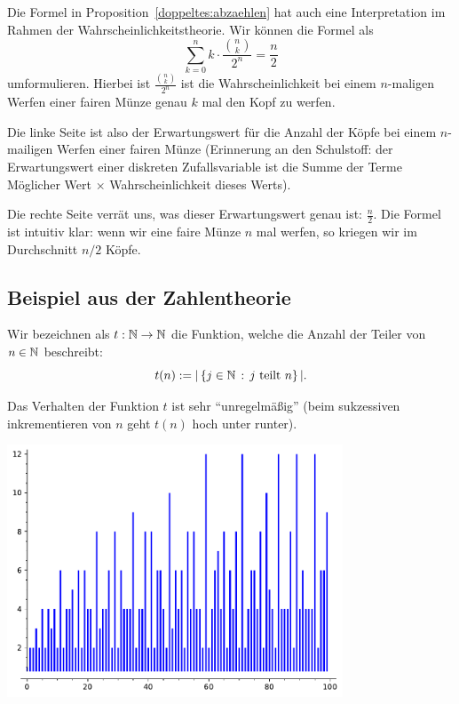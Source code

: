 \begin{bem}
	Die Formel in Proposition~\ref{doppeltes:abzaehlen} hat auch eine Interpretation im Rahmen der Wahrscheinlichkeitstheorie. Wir können die Formel als 
	\[
		\sum_{k=0}^n k \cdot \frac{\binom{n}{k}}{2^n} =  \frac{n}{2}
	\]
	umformulieren. Hierbei ist $\frac{\binom{n}{k}}{2^n}$ ist die Wahrscheinlichkeit bei einem $n$-maligen Werfen einer fairen Münze genau $k$ mal den Kopf zu werfen.
	
	 Die linke Seite ist also der Erwartungswert für die Anzahl der Köpfe bei einem $n$-mailigen Werfen einer fairen Münze (Erinnerung an den Schulstoff: der Erwartungswert einer diskreten Zufallsvariable ist die Summe der Terme Möglicher Wert $\times $ Wahrscheinlichkeit dieses Werts). 
	 
	 Die rechte Seite verrät uns, was dieser Erwartungswert genau ist: $\frac{n}{2}$. Die Formel ist intuitiv klar: wenn wir eine faire Münze $n$ mal werfen, so kriegen wir im Durchschnitt $n/2$ Köpfe. 
\end{bem} 

\subsection{Beispiel aus der Zahlentheorie} 

\begin{defn}
	Wir bezeichnen als $t : \mathbb{N} \to \mathbb{N}$ die Funktion, welche die Anzahl der Teiler von $n \in \mathbb{N}$ beschreibt:
	\[
			t(n) := | \setcond{j \in \N}{j  \ \text{teilt} \ n} |.
	\]
\end{defn}

\begin{bem}
	Das Verhalten der Funktion $t$ ist sehr ``unregelmäßig'' (beim sukzessiven inkrementieren von $n$ geht $t(n)$ hoch unter runter).  
	\begin{center}
			\includegraphics[width=10cm]{Pics/t_plot.pdf}
	\end{center} 
\end{bem}

